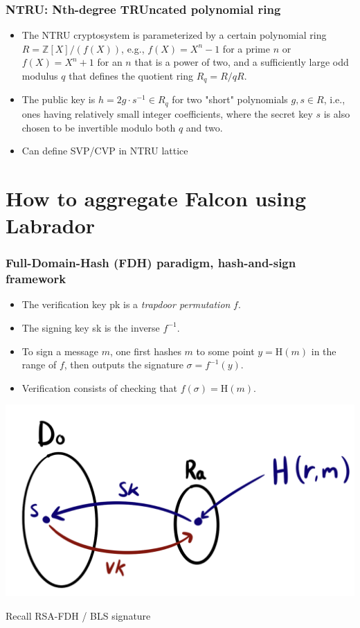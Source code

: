 \documentclass{beamer}
\begin{document}
\begin{frame}
\frametitle{NTRU: Nth-degree TRUncated polynomial ring}

\begin{itemize}
	\item The NTRU cryptosystem is parameterized by a certain polynomial ring $R=\mathbb{Z}[X] /(f(X))$, e.g., $f(X)=X^n-1$ for a prime $n$ or $f(X)=X^n+1$ for an $n$ that is a power of two, and a sufficiently large odd modulus $q$ that defines the quotient ring $R_q=R / q R$.
	\item The public key is $h=2 g \cdot s^{-1} \in R_q$ for two "short" polynomials $g, s \in R$, i.e., ones having relatively small integer coefficients, where the secret key $s$ is also chosen to be invertible modulo both $q$ and two. 
	\item Can define SVP/CVP in NTRU lattice
\end{itemize}

\end{frame}



\section{How to aggregate Falcon using Labrador}

\begin{frame}
\frametitle{Full-Domain-Hash (FDH) paradigm, hash-and-sign framework}


\begin{itemize}
	\item The verification key pk is a \emph{trapdoor permutation} $f$. 
	\item The signing key sk is the inverse $f^{-1}$. 
	\item To sign a message $m$, one first hashes $m$ to some point $y=\mathrm{H}(m)$ in the range of $f$, then outputs the signature $\sigma=f^{-1}(y)$. 
	\item Verification consists of checking that $f(\sigma)=\mathrm{H}(m)$.
\end{itemize}

\includegraphics[scale=0.4]{hashandsign.png}

Recall RSA-FDH / BLS signature	

\end{frame}
\end{document}
